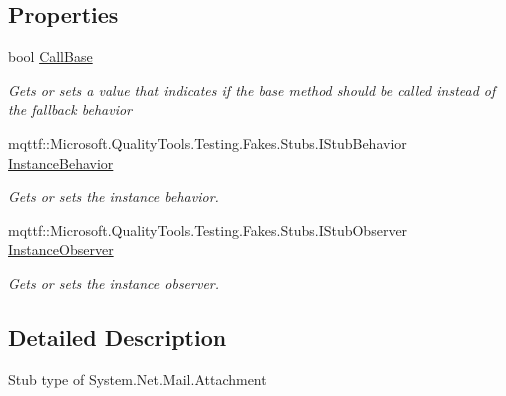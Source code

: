 \subsection*{Properties}
\begin{DoxyCompactItemize}
\item 
bool \hyperlink{class_system_1_1_net_1_1_mail_1_1_fakes_1_1_stub_attachment_aafb76869634291eb7281bc0c632d2e5b}{Call\-Base}
\begin{DoxyCompactList}\small\item\em Gets or sets a value that indicates if the base method should be called instead of the fallback behavior\end{DoxyCompactList}\item 
mqttf\-::\-Microsoft.\-Quality\-Tools.\-Testing.\-Fakes.\-Stubs.\-I\-Stub\-Behavior \hyperlink{class_system_1_1_net_1_1_mail_1_1_fakes_1_1_stub_attachment_ad9ced4984206c42f7d76e5194a91c317}{Instance\-Behavior}
\begin{DoxyCompactList}\small\item\em Gets or sets the instance behavior.\end{DoxyCompactList}\item 
mqttf\-::\-Microsoft.\-Quality\-Tools.\-Testing.\-Fakes.\-Stubs.\-I\-Stub\-Observer \hyperlink{class_system_1_1_net_1_1_mail_1_1_fakes_1_1_stub_attachment_a0d98e640d4378af8054963d48221513a}{Instance\-Observer}
\begin{DoxyCompactList}\small\item\em Gets or sets the instance observer.\end{DoxyCompactList}\end{DoxyCompactItemize}


\subsection{Detailed Description}
Stub type of System.\-Net.\-Mail.\-Attachment



